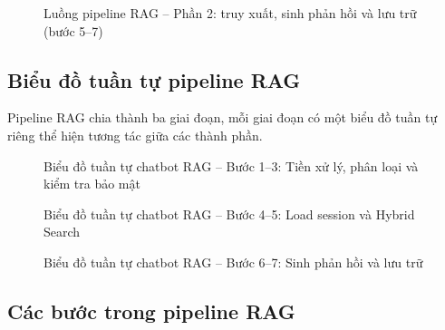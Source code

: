 \begin{figure}[H]
  \centering
  \caption{Luồng pipeline RAG -- Phần 2: truy xuất, sinh phản hồi và lưu trữ (bước 5--7)}
  \label{fig:rag_pipeline_flow_2}
\end{figure}

\subsection{Biểu đồ tuần tự pipeline RAG}
\label{sec:c3_rag_sequence}

Pipeline RAG chia thành ba giai đoạn, mỗi giai đoạn có một biểu đồ tuần tự riêng thể hiện tương tác giữa các thành phần.

\begin{figure}[H]
  \centering
  \caption{Biểu đồ tuần tự chatbot RAG -- Bước 1--3: Tiền xử lý, phân loại và kiểm tra bảo mật}
  \label{fig:seq_chatbot_preprocess}
\end{figure}

\begin{figure}[H]
  \centering
  \caption{Biểu đồ tuần tự chatbot RAG -- Bước 4--5: Load session và Hybrid Search}
  \label{fig:seq_chatbot_retrieve}
\end{figure}

\begin{figure}[H]
  \centering
  \caption{Biểu đồ tuần tự chatbot RAG -- Bước 6--7: Sinh phản hồi và lưu trữ}
  \label{fig:seq_chatbot_generate}
\end{figure}

\subsection{Các bước trong pipeline RAG}

